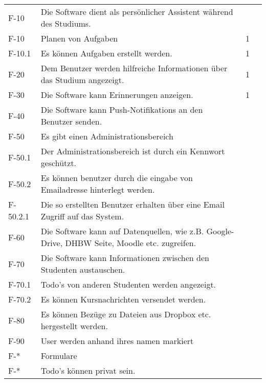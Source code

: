 \begin{tabularx}{\textwidth}{|l|X|l|l|}
    F-10 & Die Software dient als persönlicher Assistent während des Studiums. & & \\
    F-10 & Planen von Aufgaben & 1 & \\
    F-10.1 & Es können Aufgaben erstellt werden. & 1 & \\

    F-20 & Dem Benutzer werden hilfreiche Informationen über das Studium angezeigt. & 1 & \\

    F-30 & Die Software kann Erinnerungen anzeigen. & 1 & \\

    F-40 & Die Software kann Push-Notifikations an den Benutzer senden. & & \\

    F-50 & Es gibt einen Administrationsbereich & & \\
    F-50.1 & Der Administrationsbereich ist durch ein Kennwort geschützt. & & \\ %
    F-50.2 & Es können benutzer durch die eingabe von Emailadresse hinterlegt werden. & & \\
    F-50.2.1 & Die so erstellten Benutzer erhalten über eine Email Zugriff auf das System. & & \\ %
    
    F-60 & Die Software kann auf Datenquellen, wie z.B. Google-Drive, DHBW Seite, Moodle etc. zugreifen. & & \\

    F-70 & Die Software kann Informationen zwischen den Studenten austauschen. & & \\
    F-70.1 & Todo's von anderen Studenten werden angezeigt. & &\\
    F-70.2 & Es können Kursnachrichten versendet werden. & &\\
    F-80 & Es können Bezüge zu Dateien aus Dropbox etc. hergestellt werden. & &\\
    F-90 & User werden anhand ihres namen markiert & &\\ %

    F-* & Formulare & &\\

    F-* & Todo's können privat sein. & & \\

    




    \bottomrule
\end{tabularx}


